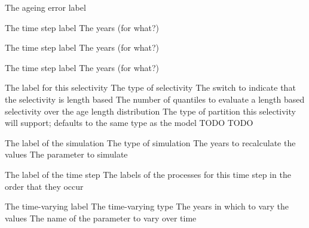 \par\textbf{}\par
{} {The ageing error label}

\par\textbf{}\par

\par\textbf{}\par
{} {The time step label}
 {The years (for what?)}

\par\textbf{}\par
{} {The time step label}
 {The years (for what?)}

\par\textbf{}\par
{} {The time step label}
 {The years (for what?)}

\par\textbf{}\par

\par\par
{} {The label for this selectivity}
 {The type of selectivity}
 {The switch to indicate that the selectivity is length based}
 {The number of quantiles to evaluate a length based selectivity over the age length distribution}
 {The type of partition this selectivity will support; defaults to the same type as the model}
 {TODO}
 {TODO}

\par\par
{} {The label of the simulation}
 {The type of simulation}
 {The years to recalculate the values}
 {The parameter to simulate}

\par\par
{} {The label of the time step}
 {The labels of the processes for this time step in the order that they occur}

\par\par
{} {The time-varying label}
 {The time-varying type}
 {The years in which to vary the values}
 {The name of the parameter to vary over time}

